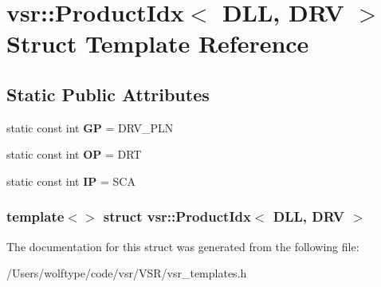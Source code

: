 \hypertarget{structvsr_1_1_product_idx_3_01_d_l_l_00_01_d_r_v_01_4}{\section{vsr\-:\-:Product\-Idx$<$ D\-L\-L, D\-R\-V $>$ Struct Template Reference}
\label{structvsr_1_1_product_idx_3_01_d_l_l_00_01_d_r_v_01_4}
}
\subsection*{Static Public Attributes}
\begin{DoxyCompactItemize}
\item 
\hypertarget{structvsr_1_1_product_idx_3_01_d_l_l_00_01_d_r_v_01_4_aa3ee9c429d8a884548c770f023e361a3}{static const int {\bfseries G\-P} = D\-R\-V\-\_\-\-P\-L\-N}\label{structvsr_1_1_product_idx_3_01_d_l_l_00_01_d_r_v_01_4_aa3ee9c429d8a884548c770f023e361a3}

\item 
\hypertarget{structvsr_1_1_product_idx_3_01_d_l_l_00_01_d_r_v_01_4_afd18318beaf5cf930d00b093fe544bb3}{static const int {\bfseries O\-P} = D\-R\-T}\label{structvsr_1_1_product_idx_3_01_d_l_l_00_01_d_r_v_01_4_afd18318beaf5cf930d00b093fe544bb3}

\item 
\hypertarget{structvsr_1_1_product_idx_3_01_d_l_l_00_01_d_r_v_01_4_a1412d565bb4da5731bbd6efe9855d838}{static const int {\bfseries I\-P} = S\-C\-A}\label{structvsr_1_1_product_idx_3_01_d_l_l_00_01_d_r_v_01_4_a1412d565bb4da5731bbd6efe9855d838}

\end{DoxyCompactItemize}
\subsubsection*{template$<$$>$ struct vsr\-::\-Product\-Idx$<$ D\-L\-L, D\-R\-V $>$}



The documentation for this struct was generated from the following file\-:\begin{DoxyCompactItemize}
\item 
/\-Users/wolftype/code/vsr/\-V\-S\-R/vsr\-\_\-templates.\-h\end{DoxyCompactItemize}
